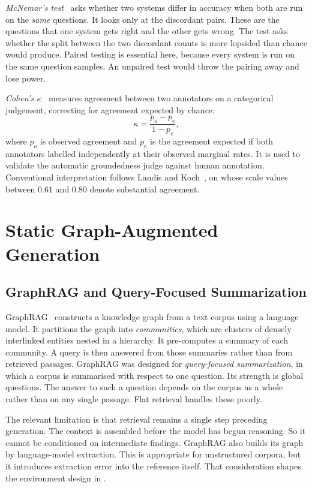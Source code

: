 \emph{McNemar's test}~\cite{mcnemar1947note} asks whether two systems differ in
accuracy when both are run on the \emph{same} questions. It looks only at the
discordant pairs. These are the questions that one system gets right and the
other gets wrong. The test asks whether the split between the two discordant
counts is more lopsided than chance would produce. Paired testing is essential
here, because every system is run on the same question samples. An unpaired test
would throw the pairing away and lose power.

\emph{Cohen's $\kappa$}~\cite{cohen1960coefficient} measures agreement between
two annotators on a categorical judgement, correcting for agreement expected by
chance: \[ \kappa = \frac{p_o - p_e}{1 - p_e}, \] where $p_o$ is observed
agreement and $p_e$ is the agreement expected if both annotators labelled
independently at their observed marginal rates. It is used to validate the
automatic groundedness judge against human annotation. Conventional
interpretation follows Landis and Koch~\cite{landis1977measurement}, on whose
scale values between $0.61$ and $0.80$ denote substantial agreement.

\section{Static Graph-Augmented Generation}\label{sec:static-graphrag}

\subsection{GraphRAG and Query-Focused Summarization}

GraphRAG~\cite{edge2024local} constructs a knowledge graph from a text
corpus using a language model. It partitions the graph into
\emph{communities}, which are clusters of densely interlinked entities nested in
a hierarchy. It pre-computes a summary of each community. A query is then
answered from those summaries rather than from retrieved passages. GraphRAG was
designed for \emph{query-focused summarization}, in which a corpus is summarised
with respect to one question. Its strength is global questions. The answer to
such a question depends on the corpus as a whole rather than on any single
passage. Flat retrieval handles these poorly.

The relevant limitation is that retrieval remains a single step preceding
generation. The context is assembled before the model has begun reasoning. So it
cannot be conditioned on intermediate findings. GraphRAG also builds its graph
by language-model extraction. This is appropriate for unstructured corpora, but
it introduces extraction error into the reference itself. That consideration
shapes the environment design in .

